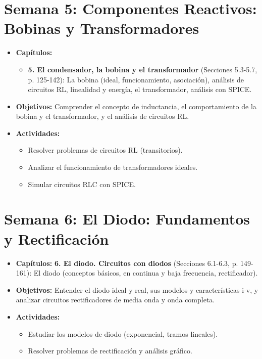 \documentclass[12pt,a4paper]{article}
\begin{document}
\section{Semana 5: Componentes Reactivos: Bobinas y Transformadores}
\begin{itemize}
    \item \textbf{Capítulos:}
    \begin{itemize}
        \item \textbf{5. El condensador, la bobina y el transformador} (Secciones 5.3-5.7, p. 125-142): La bobina (ideal, funcionamiento, asociación), análisis de circuitos RL, linealidad y energía, el transformador, análisis con SPICE.
    \end{itemize}
    \item \textbf{Objetivos:} Comprender el concepto de inductancia, el comportamiento de la bobina y el transformador, y el análisis de circuitos RL.
    \item \textbf{Actividades:}
    \begin{itemize}
        \item Resolver problemas de circuitos RL (transitorios).
        \item Analizar el funcionamiento de transformadores ideales.
        \item Simular circuitos RLC con SPICE.
    \end{itemize}
\end{itemize}

\section{Semana 6: El Diodo: Fundamentos y Rectificación}
\begin{itemize}
    \item \textbf{Capítulos:} \textbf{6. El diodo. Circuitos con diodos} (Secciones 6.1-6.3, p. 149-161): El diodo (conceptos básicos, en continua y baja frecuencia, rectificador).
    \item \textbf{Objetivos:} Entender el diodo ideal y real, sus modelos y características i-v, y analizar circuitos rectificadores de media onda y onda completa.
    \item \textbf{Actividades:}
    \begin{itemize}
        \item Estudiar los modelos de diodo (exponencial, tramos lineales).
        \item Resolver problemas de rectificación y análisis gráfico.
    \end{itemize}
\end{itemize}
\end{document}
